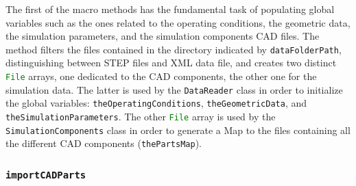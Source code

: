 The first of the macro methods has the fundamental task of populating global variables such as the ones related to the operating conditions, the geometric data, the simulation parameters, and the simulation components \gls{CAD} files. The method filters the files contained in the directory indicated by \lstinline[language=Java]!dataFolderPath!, distinguishing between STEP files and XML data file, and creates two distinct \lstinline[language=Java]!File! arrays, one dedicated to the \gls{CAD} components, the other one for the simulation data. The latter is used by the \lstinline[language=Java]!DataReader! class in order to initialize the global variables: \lstinline[language=Java]!theOperatingConditions!, \lstinline[language=Java]!theGeometricData!, and \lstinline[language=Java]!theSimulationParameters!. The other \lstinline[language=Java]!File! array is used by the \lstinline[language=Java]!SimulationComponents! class in order to generate a \gls{Map} to the files containing all the different \gls{CAD} components (\lstinline[language=Java]!thePartsMap!).

\subsubsection{\texttt{importCADParts}}

